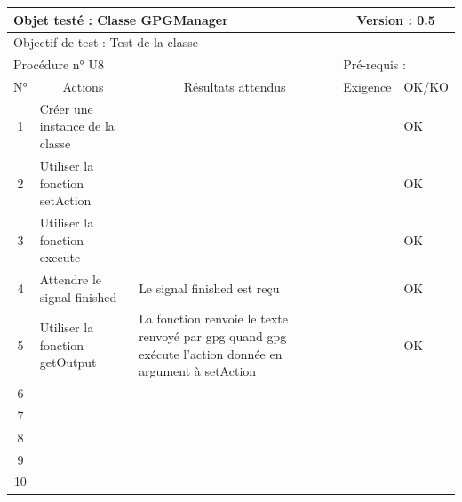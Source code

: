 \documentclass{../res/univ-projet}
\begin{document}
\begin{center}
    \begin{tabular}{|c|p{5cm}|p{5cm}|p{1.5cm}|p{1.5cm}|}
      \hline
      \multicolumn{3}{|l|}{Objet testé : Classe GPGManager} & \multicolumn{2}{c|}{Version : 0.5}\\ \hline
      \multicolumn{5}{|l|}{Objectif de test : Test de la classe}\\ \hline
      \multicolumn{3}{|l|}{Procédure n° U8} & \multicolumn{2}{p{3cm}|}{Pré-requis : }\\ \hline
      \multicolumn{1}{|c|}{N°} & \multicolumn{1}{c|}{Actions} & \multicolumn{1}{c|}{Résultats attendus} & 
      \multicolumn{1}{c|}{Exigence} & \multicolumn{1}{c|}{OK/KO}\\ \hline
      1 & Créer une instance de la classe &  &  & OK \\
      2 & Utiliser la fonction setAction &  &  & OK \\
      3 & Utiliser la fonction execute &  &  & OK \\
      4 & Attendre le signal finished & Le signal finished est reçu &  & OK \\
      5 & Utiliser la fonction getOutput & La fonction renvoie le texte renvoyé par gpg quand gpg exécute l'action donnée en argument à setAction &  & OK \\
	    6 & &  &  &  \\
      7 &  &  &  &  \\
      8 &  &  &  &  \\
      9 &  &  &  & \\
      10 &  &  &  & \\ 
	\hline
    \end{tabular}
    \vskip 2.2cm
	



\end{center}
\end{document}
